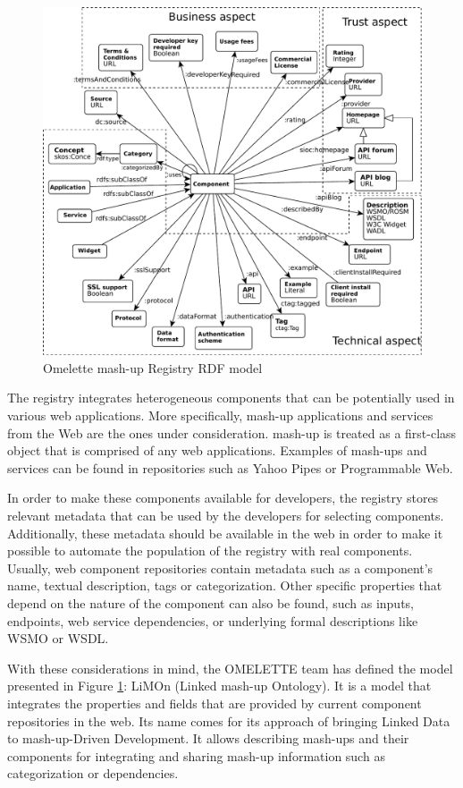 \begin{figure}[ht!]
	\centering
	\includegraphics[width=400pt]{graphics/limon.pdf}
	\caption{Omelette mash-up Registry RDF model}
	\label{fig:omeletterdfmodel}
\end{figure}

The registry integrates heterogeneous components that can be potentially used in various web applications. More specifically, mash-up applications and services from the Web are the ones under consideration. mash-up is treated as a first-class object that is comprised of any web applications. Examples of mash-ups and services can be found in repositories such as Yahoo Pipes or Programmable Web.

In order to make these components available for developers, the registry stores relevant metadata that can be used by the developers for selecting components. Additionally, these metadata should be available in the web in order to make it possible to automate the population of the registry with real components. Usually, web component repositories contain metadata such as a component's name, textual description, tags or categorization. Other specific properties that depend on the nature of the component can also be found, such as inputs, endpoints, web service dependencies, or underlying formal descriptions like WSMO or WSDL.

With these considerations in mind, the OMELETTE team has defined the model presented in Figure \ref{fig:omeletterdfmodel}: LiMOn (Linked mash-up Ontology). It is a model that integrates the properties and fields that are provided by current component repositories in the web. Its name comes for its approach of bringing Linked Data to mash-up-Driven Development. It allows describing mash-ups and their components for integrating and sharing mash-up information such as categorization or dependencies.

